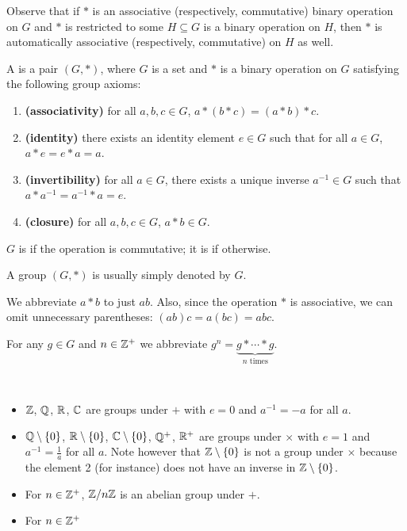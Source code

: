 \begin{remark}
Observe that if $\ast$ is an associative (respectively, commutative) binary operation on $G$ and $\ast$ is restricted to some $H\subseteq G$ is a binary operation on $H$, then $\ast$ is automatically associative (respectively, commutative) on $H$ as well.
\end{remark}

\begin{definition}
A  is a pair $(G,\ast)$, where $G$ is a set and $\ast$ is a binary operation on $G$ satisfying the following group axioms:
\begin{enumerate}[label=(\roman*)]
\item \textbf{(associativity)} for all $a,b,c \in G$, $a \ast (b \ast c)=(a \ast b) \ast c$.
\item \textbf{(identity)} there exists an identity element $e \in G$ such that for all $a\in G$, $a \ast e = e \ast a = a$.
\item \textbf{(invertibility)} for all $a \in G$, there exists a unique inverse $a^{-1} \in G$ such that $a \ast a^{-1} = a^{-1} \ast a = e$.
\item \textbf{(closure)} for all $a,b,c \in G$, $a\ast b\in G$.
\end{enumerate}

$G$ is  if the operation is commutative; it is  if otherwise.
\end{definition}

\begin{notation}
A group $(G,\ast)$ is usually simply denoted by $G$.
\end{notation}

\begin{notation}
We abbreviate $a \ast b$ to just $ab$. Also, since the operation $\ast$ is associative, we can omit unnecessary parentheses: $(ab)c = a(bc) = abc$.
\end{notation}

\begin{notation}
For any $g\in G$ and $n\in\mathbb Z^+$ we abbreviate $g^n=\underbrace{g \ast \cdots \ast g}_{n\text{ times}}$.
\end{notation}

\begin{example} \
\begin{itemize}
\item $\mathbb Z$, $\mathbb Q$, $\mathbb R$, $\mathbb C$ are groups under $+$ with $e=0$ and $a^{-1}=-a$ for all $a$.
\item $\mathbb Q\setminus\{0\}$, $\mathbb R\setminus\{0\}$, $\mathbb C\setminus\{0\}$, $\mathbb Q^+$, $\mathbb R^+$ are groups under $\times$ with $e=1$ and $a^{-1}=\frac{1}{a}$ for all $a$. Note however that $\mathbb Z\setminus\{0\}$ is not a group under $\times$ because the element 2 (for instance) does not have an inverse in $\mathbb Z\setminus\{0\}$.
\item For $n\in\mathbb Z^+$, $\mathbb Z/n\mathbb Z$ is an abelian group under $+$.
\item For $n\in\mathbb Z^+$
\end{itemize}
\end{example}

